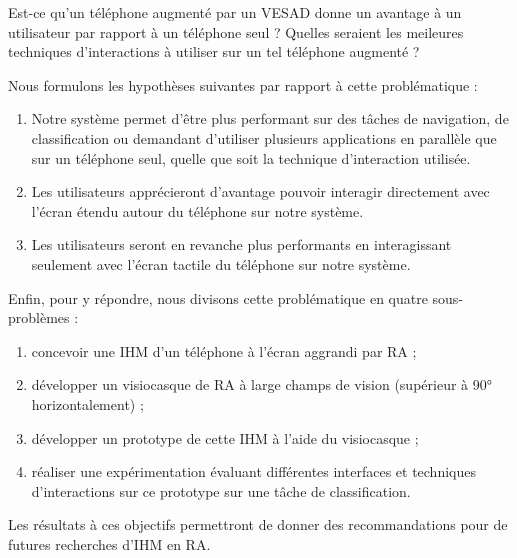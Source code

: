 \begin{displayquote}
  Est-ce qu'un téléphone augmenté par un VESAD donne un avantage à un utilisateur par rapport à un téléphone seul ? Quelles seraient les meileures techniques d'interactions à utiliser sur un tel téléphone augmenté ?
\end{displayquote}

Nous formulons les hypothèses suivantes par rapport à cette problématique :
\begin{enumerate}
  \item Notre système	permet d'être plus performant sur des tâches de navigation, de classification ou demandant d'utiliser plusieurs applications en parallèle que sur un téléphone seul, quelle que soit la technique d'interaction utilisée.
  \item Les utilisateurs apprécieront d'avantage pouvoir interagir directement avec l'écran étendu autour du téléphone sur notre système.
  \item Les utilisateurs seront en revanche plus performants en interagissant seulement avec l'écran tactile du téléphone sur notre système.
\end{enumerate}

Enfin, pour y répondre, nous divisons cette problématique en quatre sous-problèmes :
\begin{enumerate}
  \item concevoir une IHM d'un téléphone à l'écran aggrandi par RA ;
  \item développer un visiocasque de RA à large champs de vision (supérieur à \ang{90} horizontalement) ;
  \item développer un prototype de cette IHM à l'aide du visiocasque ;
  \item réaliser une expérimentation évaluant différentes interfaces et techniques d'interactions sur ce prototype sur une tâche de classification.
\end{enumerate}

Les résultats à ces objectifs permettront de donner des recommandations pour de futures recherches d'IHM en RA.